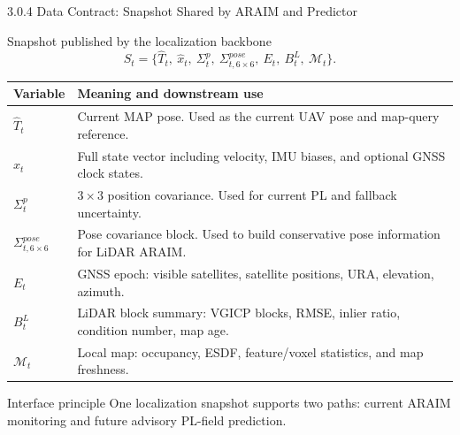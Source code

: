 \documentclass[10pt,aspectratio=169,xcolor=dvipsnames]{beamer}
\newcommand{\Mmap}{\mathcal{M}}
\begin{document}
\begin{frame}{3.0.4 Data Contract: Snapshot Shared by ARAIM and Predictor}
  \small
  \begin{block}{Snapshot published by the localization backbone}
    \vspace{-4pt}
    \[
      S_t=\{\hat{T}_t,\ \hat{x}_t,\ \Sigma^p_t,\ \Sigma^{pose}_{t,6\times6},\ E_t,\ B^L_t,\ \Mmap_t\}.
    \]
  \end{block}

  \begin{table}\scriptsize
    \begin{tabular}{p{} p{}}
      \toprule
      \textbf{Variable} & \textbf{Meaning and downstream use}\\
      \midrule
      $\hat{T}_t$ & Current MAP pose. Used as the current UAV pose and map-query reference.\\
      $\hat{x}_t$ & Full state vector including velocity, IMU biases, and optional GNSS clock states.\\
      $\Sigma^p_t$ & $3\times3$ position covariance. Used for current PL and fallback uncertainty.\\
      $\Sigma^{pose}_{t,6\times6}$ & Pose covariance block. Used to build conservative pose information for LiDAR ARAIM.\\
      $E_t$ & GNSS epoch: visible satellites, satellite positions, URA, elevation, azimuth.\\
      $B^L_t$ & LiDAR block summary: VGICP blocks, RMSE, inlier ratio, condition number, map age.\\
      $\Mmap_t$ & Local map: occupancy, ESDF, feature/voxel statistics, and map freshness.\\
      \bottomrule
    \end{tabular}
  \end{table}

  \begin{exampleblock}{Interface principle}
    \footnotesize One localization snapshot supports two paths: current ARAIM monitoring and future advisory PL-field prediction.
  \end{exampleblock}
\end{frame}
\end{document}
